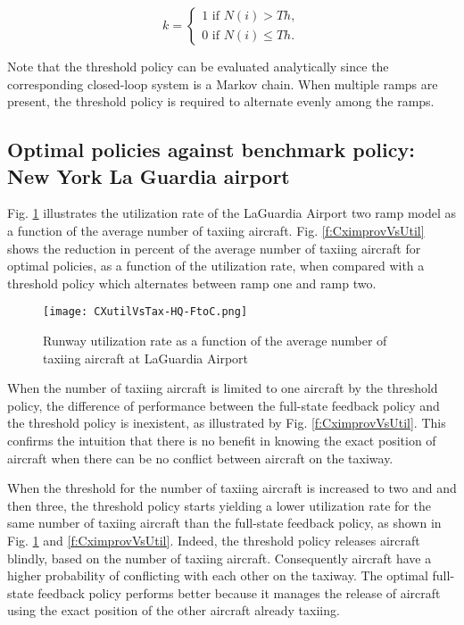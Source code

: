 \documentclass[letterpaper]{article}
\begin{document}
\begin{equation} \label{e:theq1}
k =
\begin{cases}
1 \text{  if $N(i) > Th$},\\
0 \text{  if $N(i) \leq Th$}.
\end{cases}
\end{equation}

Note that the threshold policy can be evaluated analytically since the corresponding closed-loop system is a Markov chain. When multiple ramps are present, the threshold policy is required to alternate evenly among the ramps.

\subsection{Optimal policies against benchmark policy: New York La Guardia airport}

Fig. \ref{f:CXutilVsTax} illustrates the utilization rate of the LaGuardia Airport two ramp model 
as a function of the average number of taxiing aircraft. 
Fig. \ref{f:CximprovVsUtil} shows the reduction in percent of the average number of taxiing aircraft for optimal policies, 
as a function of the utilization rate,
when compared with a threshold policy which alternates between ramp one and ramp two.
\begin{figure}[ht]\hspace{-5mm}
\texttt{[image: CXutilVsTax-HQ-FtoC.png]}
\caption{Runway utilization rate as a function of the average number of taxiing aircraft at LaGuardia Airport}
\label{f:CXutilVsTax}
\end{figure}

When the number of taxiing aircraft is limited to one aircraft by the threshold policy, the difference of performance between the full-state
 feedback policy and the threshold policy is inexistent, as illustrated by Fig. \ref{f:CximprovVsUtil}. 
 This confirms the intuition that there is no benefit in knowing the exact  position of aircraft 
 when there can be no conflict between aircraft on the taxiway.

When the threshold for the number of taxiing aircraft is increased to two and and then three, 
the threshold policy starts yielding a lower utilization rate for the same number of taxiing aircraft than the full-state feedback policy, 
as shown in Fig. \ref{f:CXutilVsTax} and \ref{f:CximprovVsUtil}. Indeed, the threshold policy releases aircraft blindly, based on the number 
of taxiing aircraft. Consequently aircraft have a higher probability of conflicting with each other on the taxiway. 
The optimal full-state feedback policy performs better because it manages the release of aircraft using the exact position of the other aircraft already taxiing.
\end{document}
